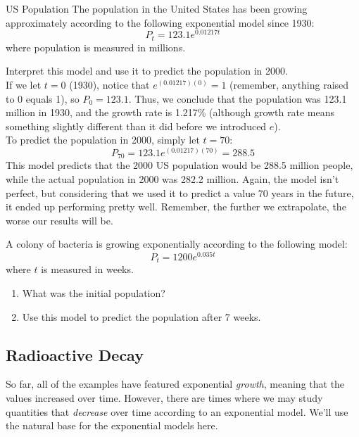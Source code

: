 \begin{example}[https://www.youtube.com/watch?v=w8k-ob4i2U0]{US Population}
The population in the United States has been growing approximately according to the following exponential model since 1930:
\[P_t = 123.1e^{0.01217t}\]
where population is measured in millions.

Interpret this model and use it to predict the population in 2000.\\

If we let $t=0$ (1930), notice that $e^{(0.01217)(0)} = 1$ (remember, anything raised to 0 equals 1), so $P_0 = 123.1$.  Thus, we conclude that the population was 123.1 million in 1930, and the growth rate is 1.217\% (although growth rate means something slightly different than it did before we introduced $e$).\\

To predict the population in 2000, simply let $t=70$:
\[P_{70} = 123.1e^{(0.01217)(70)} = 288.5\]
This model predicts that the 2000 US population would be 288.5 million people, while the actual population in 2000 was 282.2 million.  Again, the model isn't perfect, but considering that we used it to predict a value 70 years in the future, it ended up performing pretty well.  Remember, the further we extrapolate, the worse our results will be.
\end{example}

\begin{try}
A colony of bacteria is growing exponentially according to the following model:
\[P_t = 1200e^{0.035t}\]
where $t$ is measured in weeks.
\begin{enumerate}
\item What was the initial population?
\item Use this model to predict the population after 7 weeks.
\end{enumerate}
\end{try}

\subsection{Radioactive Decay}
So far, all of the examples have featured exponential \textit{growth}, meaning that the values increased over time.  However, there are times where we may study quantities that \textit{decrease} over time according to an exponential model.  We'll use the natural base for the exponential models here.

